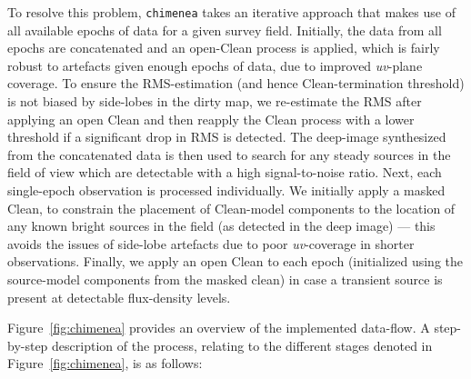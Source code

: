 \documentclass[5p,authoryear]{elsarticle}
\begin{document}
To resolve this problem, \texttt{chimenea} takes an iterative approach that makes use of all available epochs of data for a given survey field.
Initially, the data from all epochs are concatenated and an open-Clean process is applied, which is fairly robust to artefacts given enough epochs of data, due to improved \textit{uv}-plane coverage. 
To ensure the RMS-estimation (and hence Clean-termination threshold) is not biased by side-lobes in the dirty map, we re-estimate the RMS after applying an open Clean and then reapply the Clean process with a lower threshold if a significant drop in RMS is detected. 
The deep-image synthesized from the concatenated data is then used to search for any steady sources in the field of view which are detectable with a high signal-to-noise ratio.
Next, each single-epoch observation is processed individually. 
We initially apply a masked Clean, to constrain the placement of Clean-model components to the location of any known bright sources in the field (as detected in the deep image) --- this avoids the issues of side-lobe artefacts due to poor \textit{uv}-coverage in shorter observations. 
Finally, we apply an open Clean to each epoch (initialized using the source-model components from the masked clean) in case a transient source is present at detectable flux-density levels.

Figure~\ref{fig:chimenea} provides an overview of the implemented data-flow. 
A step-by-step description of the process, relating to the different stages denoted in Figure~\ref{fig:chimenea}, is as follows:
\end{document}
